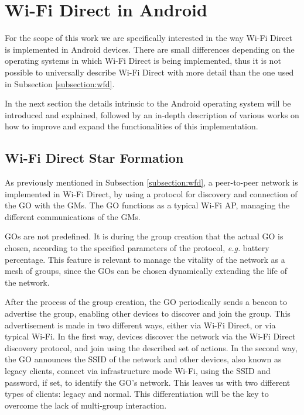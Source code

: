 
\section{Wi-Fi Direct in Android}
\label{sec:wfd}

For the scope of this work we are specifically interested in the way Wi-Fi Direct is implemented in Android devices. There are small differences depending on the operating systems in which Wi-Fi Direct is being implemented, thus it is not possible to universally describe Wi-Fi Direct with more detail than the one used in Subsection \ref{subsection:wfd}.

In the next section the details intrinsic to the Android operating system will be introduced and explained, followed by an in-depth description of various works on how to improve and expand the functionalities of this implementation.

\subsection{Wi-Fi Direct Star Formation}
\label{subsection:wfdstar}

As previously mentioned in Subsection \ref{subsection:wfd}, a peer-to-peer network is implemented in Wi-Fi Direct, by using a protocol for discovery and connection of the \gls{GO} with the \glspl{GM}. The \gls{GO} functions as a typical Wi-Fi \gls{AP}, managing the different communications of the \glspl{GM}.

\glspl{GO} are not predefined. It is during the group creation that the actual \gls{GO} is chosen, according to the specified parameters of the protocol, \textit{e.g.} battery percentage. This feature is relevant to manage the vitality of the network as a mesh of groups, since the \glspl{GO} can be chosen dynamically extending the life of the network.

After the process of the group creation, the \gls{GO} periodically sends a beacon to advertise the group, enabling other devices to discover and join the group. This advertisement is made in two different ways, either via Wi-Fi Direct, or via typical Wi-Fi. In the first way, devices discover the network via the Wi-Fi Direct discovery protocol, and join using the described set of actions. In the second way, the \gls{GO} announces the \gls{SSID} of the network and other devices, also known as legacy clients, connect via infrastructure mode Wi-Fi, using the \gls{SSID} and password, if set, to identify the \gls{GO}'s network. This leaves us with two different types of clients: legacy and normal. This differentiation will be the key to overcome the lack of multi-group interaction.

